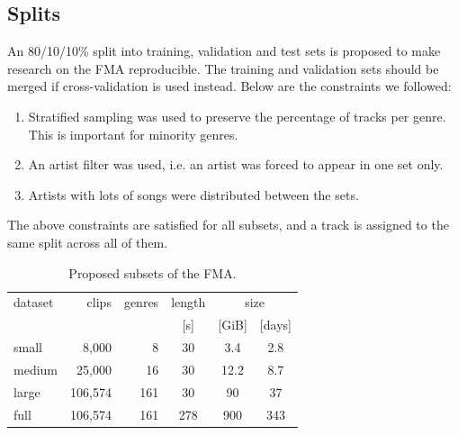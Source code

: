 \documentclass{article}
\newcommand{\ntracks}{106,574 }
\newcommand{\tduration}{343 }
\newcommand{\aduration}{278 }
\newcommand{\size}{900 }
\begin{document}
\subsection{Splits}

An 80/10/10\% split into training, validation and test sets is proposed to make research on the FMA reproducible. The training and validation sets should be merged if cross-validation is used instead.
Below are the constraints we followed:
\begin{enumerate}
	\item Stratified sampling was used to preserve the percentage of tracks per genre. This is important for minority genres.
	\item An artist filter was used, i.e. an artist was forced to appear in one set only. %
	\item Artists with lots of songs were distributed between the sets. %
\end{enumerate}
The above constraints are satisfied for all subsets, and a track is assigned to the same split across all of them.

\begin{table}
	\centering
	\begin{tabular}{lrrccc}
		\toprule
		dataset & clips & genres & length & \multicolumn{2}{c}{size} \\
		\cmidrule{5-6}
		        &       &        &  [s]   & [GiB] & [days] \\
		\midrule
		small  &    8,000 &   8 &  30 & 3.4  & 2.8  \\
		medium &   25,000 &  16 &  30 & 12.2 & 8.7  \\
		large  & \ntracks & 161 &  30 & 90   & 37 \\
		full   & \ntracks & 161 & \aduration & \size & \tduration  \\
		\bottomrule
	\end{tabular}
	\caption{Proposed subsets of the FMA.}
	\label{tab:subsets}
\end{table}
\end{document}
